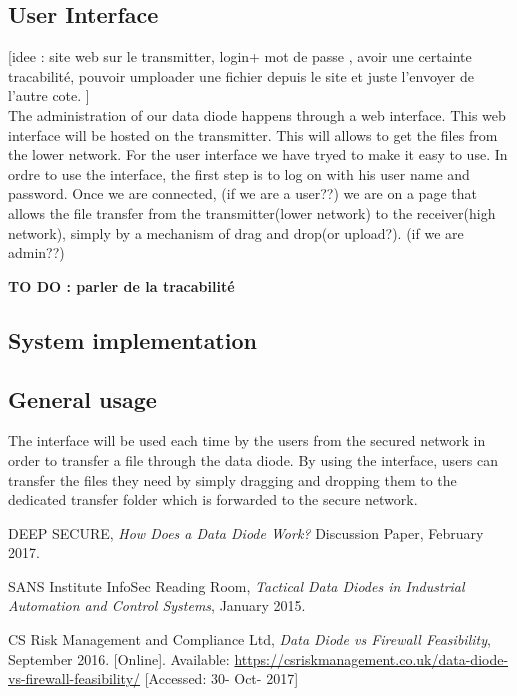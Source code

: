 \documentclass[a4paper,10pt]{article}
\begin{document}
\subsection{User Interface}\label{UI}


[idee : site web sur le transmitter, login+ mot de passe , avoir une certainte tracabilité, pouvoir umploader une fichier depuis le site et juste l'envoyer de l'autre cote. ]\\


The administration of our data diode happens through a web interface.
This web interface will be hosted on the transmitter. This will allows to get the
files from the lower network. For the user interface we have tryed to make it
easy to use. In ordre to use the interface, the first step is to log on with his
user name and password.  Once we are connected, (if we are a user??)
we are on a page that allows the file transfer from the transmitter(lower network)
to the receiver(high network), simply by a mechanism of drag and drop(or upload?).
(if we are admin??)

\textbf{TO DO : parler de la tracabilité}


\subsection{System implementation}
\subsection{General usage}
The interface will be used each time by the users from the secured network
in order to transfer a file through the data diode. By using the interface,
users can transfer the files they need by simply dragging and dropping them to
the dedicated transfer folder which is forwarded to the secure network.


\begin{thebibliography}{9}


DEEP SECURE,
\textit{How	Does a Data Diode Work?}
Discussion Paper, February 2017.

SANS Institute InfoSec Reading Room,
\textit{Tactical Data Diodes in Industrial Automation and Control Systems}, January 2015.

CS Risk Management and Compliance Ltd,
\textit{Data Diode vs Firewall Feasibility}, September 2016. [Online]. Available: \url{https://csriskmanagement.co.uk/data-diode-vs-firewall-feasibility/} [Accessed: 30- Oct- 2017]

\end{thebibliography}
\end{document}

